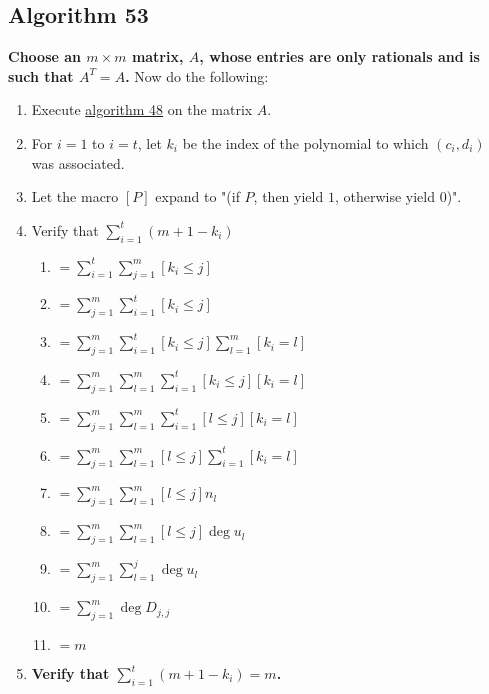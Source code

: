 \documentclass[twocolumn]{article}
\begin{document}
		\subsection{Algorithm 53}\label{sec:algorithm 53}
			\textbf{Choose an $m\times m$ matrix, $A$, whose entries are only rationals and is such that $A^T=A$.} Now do the following:
			\begin{enumerate}
				\item Execute \hyperref[sec:algorithm 48]{algorithm 48} on the matrix $A$.
				\item For $i=1$ to $i=t$, let $k_i$ be the index of the polynomial to which $(c_i, d_i)$ was associated.
				\item Let the macro $[P]$ expand to "(if $P$, then yield $1$, otherwise yield $0$)".
				\item Verify that $\sum_{i=1}^t(m+1-k_i)$
				\begin{enumerate}
					\item $=\sum_{i=1}^t\sum_{j=1}^m [k_i\le j]$
					\item $=\sum_{j=1}^m\sum_{i=1}^t [k_i\le j]$
					\item $=\sum_{j=1}^m\sum_{i=1}^t [k_i\le j]\sum_{l=1}^m [k_i=l]$
					\item $=\sum_{j=1}^m\sum_{l=1}^m\sum_{i=1}^t [k_i\le j][k_i=l]$
					\item $=\sum_{j=1}^m\sum_{l=1}^m\sum_{i=1}^t [l\le j][k_i=l]$
					\item $=\sum_{j=1}^m\sum_{l=1}^m [l\le j]\sum_{i=1}^t [k_i=l]$
					\item $=\sum_{j=1}^m\sum_{l=1}^m [l\le j]n_l$
					\item $=\sum_{j=1}^m\sum_{l=1}^m [l\le j]\deg u_l$
					\item $=\sum_{j=1}^m\sum_{l=1}^j \deg u_l$
					\item $=\sum_{j=1}^m \deg D_{j,j}$
					\item $=m$
				\end{enumerate}
				\item \textbf{Verify that $\sum_{i=1}^t(m+1-k_i)=m$.}
			\end{enumerate}
\end{document}

